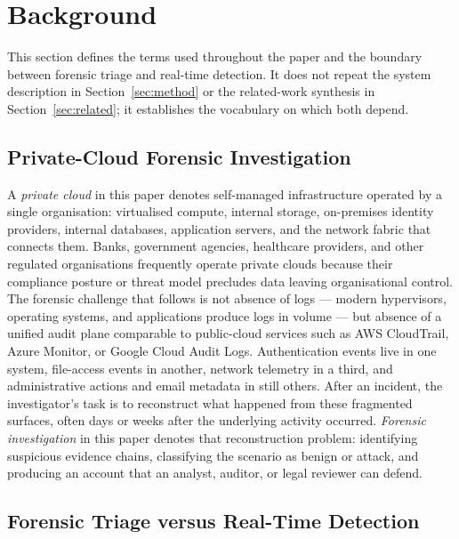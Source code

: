 \documentclass[conference]{IEEEtran}
\begin{document}
\section{Background}
\label{sec:background}

This section defines the terms used throughout the paper and the boundary between forensic triage and real-time detection. It does not repeat the system description in Section~\ref{sec:method} or the related-work synthesis in Section~\ref{sec:related}; it establishes the vocabulary on which both depend.

\subsection{Private-Cloud Forensic Investigation}
\label{sec:bg-pc}

A \emph{private cloud} in this paper denotes self-managed infrastructure operated by a single organisation: virtualised compute, internal storage, on-premises identity providers, internal databases, application servers, and the network fabric that connects them. Banks, government agencies, healthcare providers, and other regulated organisations frequently operate private clouds because their compliance posture or threat model precludes data leaving organisational control. The forensic challenge that follows is not absence of logs --- modern hypervisors, operating systems, and applications produce logs in volume --- but absence of a unified audit plane comparable to public-cloud services such as AWS CloudTrail, Azure Monitor, or Google Cloud Audit Logs. Authentication events live in one system, file-access events in another, network telemetry in a third, and administrative actions and email metadata in still others. After an incident, the investigator's task is to reconstruct what happened from these fragmented surfaces, often days or weeks after the underlying activity occurred. \emph{Forensic investigation} in this paper denotes that reconstruction problem: identifying suspicious evidence chains, classifying the scenario as benign or attack, and producing an account that an analyst, auditor, or legal reviewer can defend.

\subsection{Forensic Triage versus Real-Time Detection}
\label{sec:bg-triage}
\end{document}
